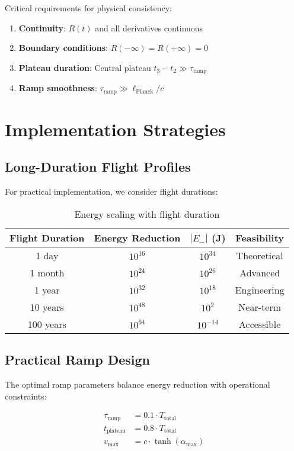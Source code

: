 \documentclass[12pt,a4paper]{article}
\begin{document}
Critical requirements for physical consistency:

\begin{enumerate}
\item \textbf{Continuity}: $R(t)$ and all derivatives continuous
\item \textbf{Boundary conditions}: $R(-\infty) = R(+\infty) = 0$
\item \textbf{Plateau duration}: Central plateau $t_3 - t_2 \gg \tau_{\text{ramp}}$
\item \textbf{Ramp smoothness}: $\tau_{\text{ramp}} \gg \ell_{\text{Planck}}/c$
\end{enumerate}

\section{Implementation Strategies}

\subsection{Long-Duration Flight Profiles}

For practical implementation, we consider flight durations:

\begin{table}[h!]
\centering
\begin{tabular}{|c|c|c|c|}
\hline
Flight Duration & Energy Reduction & $|E_-|$ (J) & Feasibility \\
\hline
1 day & $10^{16}$ & $10^{34}$ & Theoretical \\
1 month & $10^{24}$ & $10^{26}$ & Advanced \\
1 year & $10^{32}$ & $10^{18}$ & Engineering \\
10 years & $10^{48}$ & $10^{2}$ & Near-term \\
100 years & $10^{64}$ & $10^{-14}$ & Accessible \\
\hline
\end{tabular}
\caption{Energy scaling with flight duration}
\end{table}

\subsection{Practical Ramp Design}

The optimal ramp parameters balance energy reduction with operational constraints:

\begin{align}
\tau_{\text{ramp}} &= 0.1 \cdot T_{\text{total}} \\
t_{\text{plateau}} &= 0.8 \cdot T_{\text{total}} \\
v_{\text{max}} &= c \cdot \tanh(\alpha_{\text{max}})
\end{align}
\end{document}
